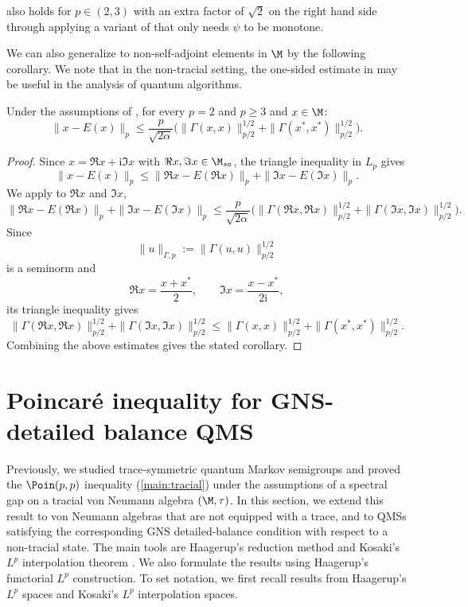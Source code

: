 \documentclass[sn-mathphys-num]{sn-jnl}
\begin{document}
\begin{remark}  also holds for $p\in(2,3)$ with an extra factor of $\sqrt{2}$ on the right hand side through applying a variant of  that only needs $\psi$ to be monotone.

\end{remark}
We can also generalize to non-self-adjoint elements in $\M$ by the following corollary.
We note that in the non-tracial setting, the one-sided estimate in  may be useful in the analysis of quantum algorithms.
\begin{cor}\label{cor:non-self-adjoint-ppp}
Under the assumptions of ,
for every $p=2$ and $p\geq 3$ and $x\in\M$:
\[
\|x-E(x)\|_{p} \leq \frac{p}{\sqrt{2\alpha}}  \bigl(\|\Gamma(x,x)\|^{1/2}_{p/2}+\|\Gamma(x^*,x^*)\|^{1/2}_{p/2}\bigr).
\]
\end{cor}
\begin{proof}
Since $x=\Re x+\mathrm i\Im x$ with $\Re x,\Im x\in\M_{sa}$, the triangle inequality in $L_p$ gives
\[
\|x-E(x)\|_p
\le
\|\Re x-E(\Re x)\|_p
+
\|\Im x-E(\Im x)\|_p.
\]
We apply  to $\Re x$ and $\Im x$,
\[
\|\Re x-E(\Re x)\|_p
+
\|\Im x-E(\Im x)\|_p
\le
\frac p{\sqrt{2\alpha}}
\bigl(
\|\Gamma(\Re x,\Re x)\|_{p/2}^{1/2}
+
\|\Gamma(\Im x,\Im x)\|_{p/2}^{1/2}
\bigr).
\]
Since
\[
\|u\|_{\Gamma,p}:=\|\Gamma(u,u)\|_{p/2}^{1/2}
\]
is a seminorm and
\[
\Re x=\frac{x+x^*}{2},
\qquad
\Im x=\frac{x-x^*}{2\mathrm i},
\]
its triangle inequality gives
\[
\|\Gamma(\Re x,\Re x)\|_{p/2}^{1/2}
+
\|\Gamma(\Im x,\Im x)\|_{p/2}^{1/2}
\le
\|\Gamma(x,x)\|_{p/2}^{1/2}
+
\|\Gamma(x^*,x^*)\|_{p/2}^{1/2}.
\]
Combining the above estimates gives the stated corollary.
\end{proof}

\section{Poincar\'e inequality for GNS-detailed balance QMS}\label{sec:GNS}
Previously, we studied trace-symmetric quantum Markov semigroups and proved the
$\Poin(p,p)$ inequality (\cref{main:tracial}) under the assumptions of a spectral gap
on a tracial von Neumann algebra $(\M,\tau)$.
In this section, we extend this result to von Neumann algebras that are not equipped
with a trace, and to QMSs satisfying the corresponding GNS detailed-balance
condition with respect to a non-tracial state.
The main tools are Haagerup's reduction method
\cite{haagerup2009reductionmethodnoncommutativelpspaces}
and Kosaki's $L^p$ interpolation theorem
\cite{kosaki_applications_1984}.
We also formulate the results using Haagerup's functorial $L^p$ construction. To set notation, we first recall results from Haagerup's $L^p$ spaces and Kosaki's $L^p$ interpolation spaces.
\end{document}
